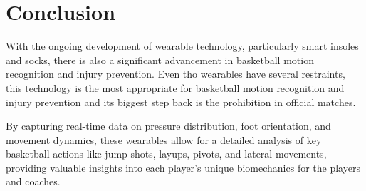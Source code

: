 


%

\chapter{Conclusion}
\label{cha:conclusion}

With the ongoing development of wearable technology, particularly smart insoles and socks, there is also a significant advancement in basketball motion recognition and 
injury prevention. Even tho wearables have several restraints, this technology is the most appropriate for basketball motion recognition and injury prevention and its biggest step 
back is the prohibition in official matches.

By capturing real-time data on pressure distribution, foot orientation, and movement dynamics, these wearables allow for a 
detailed analysis of key basketball actions like jump shots, layups, pivots, and lateral movements, providing valuable insights into each player's unique biomechanics for the players 
and coaches. 

